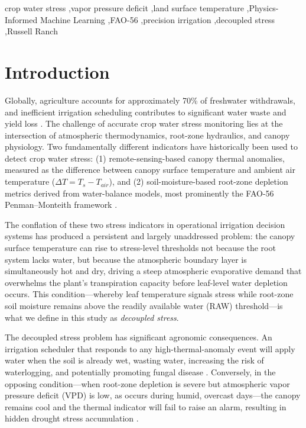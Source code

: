 \documentclass[review,12pt]{elsarticle}
\begin{document}
\begin{frontmatter}
\begin{keyword}
crop water stress \sep vapor pressure deficit \sep land surface temperature \sep Physics-Informed Machine Learning \sep FAO-56 \sep precision irrigation \sep decoupled stress \sep Russell Ranch
\end{keyword}

\end{frontmatter}

\linenumbers

\section{Introduction}
\label{sec:intro}

Globally, agriculture accounts for approximately 70\% of freshwater withdrawals, and inefficient irrigation scheduling contributes to significant water waste and yield loss \citep{fereres2007deficit}. The challenge of accurate crop water stress monitoring lies at the intersection of atmospheric thermodynamics, root-zone hydraulics, and canopy physiology. Two fundamentally different indicators have historically been used to detect crop water stress: (1) remote-sensing-based canopy thermal anomalies, measured as the difference between canopy surface temperature and ambient air temperature ($\Delta T = T_s - T_{air}$), and (2) soil-moisture-based root-zone depletion metrics derived from water-balance models, most prominently the FAO-56 Penman--Monteith framework \citep{allen1998fao}.

The conflation of these two stress indicators in operational irrigation decision systems has produced a persistent and largely unaddressed problem: the canopy surface temperature can rise to stress-level thresholds not because the root system lacks water, but because the atmospheric boundary layer is simultaneously hot and dry, driving a steep atmospheric evaporative demand that overwhelms the plant's transpiration capacity before leaf-level water depletion occurs. This condition---whereby leaf temperature signals stress while root-zone soil moisture remains above the readily available water (RAW) threshold---is what we define in this study as \textit{decoupled stress}.

The decoupled stress problem has significant agronomic consequences. An irrigation scheduler that responds to any high-thermal-anomaly event will apply water when the soil is already wet, wasting water, increasing the risk of waterlogging, and potentially promoting fungal disease \citep{gonzalez2012thermal}. Conversely, in the opposing condition---when root-zone depletion is severe but atmospheric vapor pressure deficit (VPD) is low, as occurs during humid, overcast days---the canopy remains cool and the thermal indicator will fail to raise an alarm, resulting in hidden drought stress accumulation \citep{jones2004assessment}.
\end{document}
